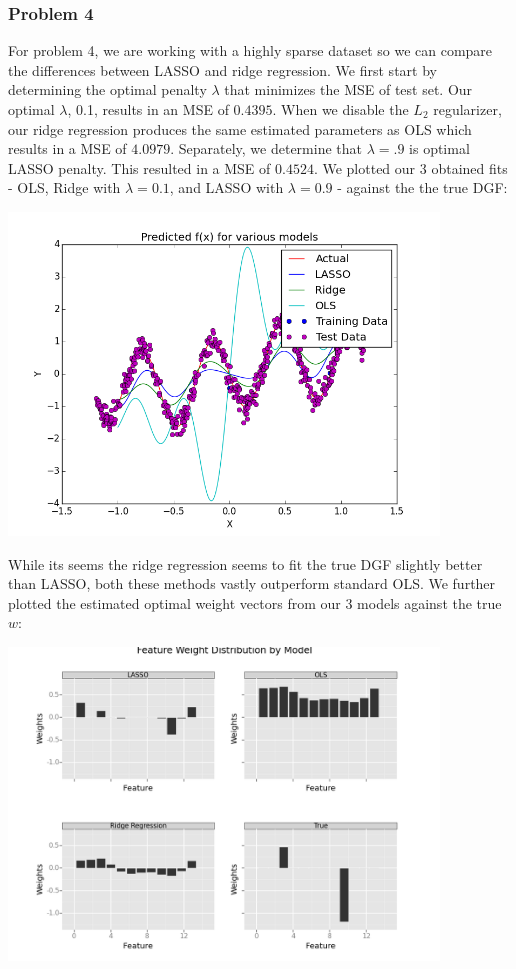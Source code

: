 \documentclass[10pt]{article}
\begin{document}
\subsubsection*{Problem 4}
For problem 4, we are working with a highly sparse dataset so we can compare the differences between LASSO and ridge regression. We first start by determining the optimal penalty $\lambda$ that minimizes the MSE of test set. Our optimal $\lambda$, 0.1, results in an MSE of $0.4395$. When we disable the $L_2$ regularizer, our ridge regression produces the same estimated parameters as OLS which results in a MSE of $4.0979$. Separately, we determine that $\lambda = .9$ is optimal LASSO penalty. This resulted in a MSE of $0.4524$. We plotted our 3 obtained fits - OLS, Ridge with $\lambda=0.1$, and LASSO with $\lambda=0.9$ - against the the true DGF:

\begin{center}
\includegraphics[width=4.5in]{plot4}	
\end{center}

While its seems the ridge regression seems to fit the true DGF slightly better than LASSO, both these methods vastly outperform standard OLS. We further plotted the estimated optimal weight vectors from our 3 models against the true $w$:

\begin{center}
\includegraphics[width=4.5in]{Weight_Distributions.png}	
\end{center}
\end{document}
